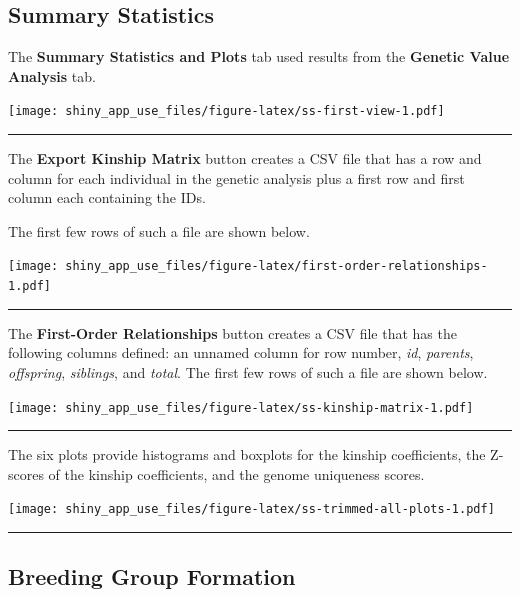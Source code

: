 \documentclass[
]{article}
\begin{document}
\hypertarget{summary-statistics}{%
\subsection{Summary Statistics}\label{summary-statistics}}

The \textbf{Summary Statistics and Plots} tab used results from the
\textbf{Genetic Value Analysis} tab.

\texttt{[image: shiny\_app\_use\_files/figure-latex/ss-first-view-1.pdf]}

\begin{center}\rule{0.5\linewidth}{\linethickness}\end{center}

The \textbf{Export Kinship Matrix} button creates a CSV file that has a
row and column for each individual in the genetic analysis plus a first
row and first column each containing the IDs.

The first few rows of such a file are shown below.

\texttt{[image: shiny\_app\_use\_files/figure-latex/first-order-relationships-1.pdf]}

\begin{center}\rule{0.5\linewidth}{\linethickness}\end{center}

The \textbf{First-Order Relationships} button creates a CSV file that
has the following columns defined: an unnamed column for row number,
\emph{id}, \emph{parents}, \emph{offspring}, \emph{siblings}, and
\emph{total}. The first few rows of such a file are shown below.

\texttt{[image: shiny\_app\_use\_files/figure-latex/ss-kinship-matrix-1.pdf]}

\begin{center}\rule{0.5\linewidth}{\linethickness}\end{center}

The six plots provide histograms and boxplots for the kinship
coefficients, the Z-scores of the kinship coefficients, and the genome
uniqueness scores.

\texttt{[image: shiny\_app\_use\_files/figure-latex/ss-trimmed-all-plots-1.pdf]}

\begin{center}\rule{0.5\linewidth}{\linethickness}\end{center}

\hypertarget{breeding-group-formation}{%
\subsection{Breeding Group Formation}\label{breeding-group-formation}}
\end{document}
